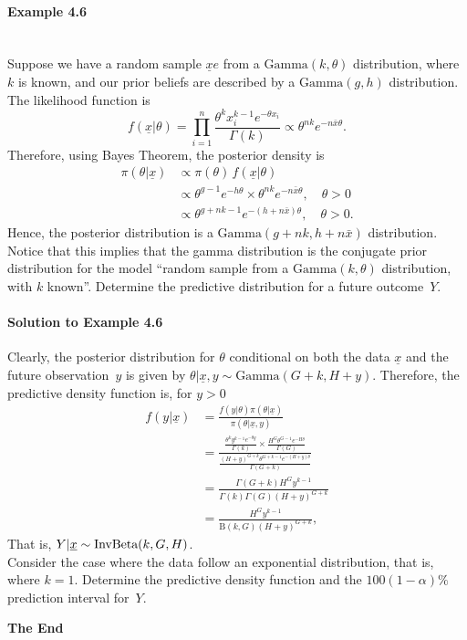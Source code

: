 \paragraph{Example 4.6}{~\\
  Suppose we have a random sample $\underline{x}e$ from a $\text{Gamma}(k,\theta)$
  distribution, where $k$ is known, and our prior beliefs are
  described by a $\text{Gamma}(g,h)$ distribution. The likelihood function is
$$ f(\underline{x}|\theta)=\prod_{i=1}^n \frac{\theta^k x_i^{k-1}e^{-\theta x_i}}{\Gamma(k)}\propto\theta^{nk}e^{-n\bar x\theta}.$$
 Therefore, using Bayes Theorem, the posterior density is
 \begin{align*}
  \pi(\theta|\underline{x}) &\propto\pi(\theta)\,f(\underline{x}|\theta) \\
  &\propto\theta^{g-1}e^{-h\theta}\times\theta^{nk}e^{-n\bar x\theta}, \quad\theta>0 \\
  &\propto\theta^{g+nk-1}e^{-(h+n\bar x)\theta},\quad\theta>0.
\end{align*}
Hence, the posterior distribution is a $\text{Gamma}(g+nk,h+n\bar x)$ distribution. Notice that this implies that the gamma distribution is the conjugate prior distribution for the model ``random sample from a $\text{Gamma}(k,\theta)$ distribution, with $k$ known''. Determine the predictive distribution for a future outcome~$Y$.

\paragraph{Solution to Example 4.6}{
    
    
    
}

\clearpage

{
    
    Clearly, the posterior distribution for $\theta$ conditional on both
    the data $\underline{x}$ and the future observation~$y$ is given by
    $\theta|\underline{x},y\sim \text{Gamma}(G+k,H+y)$. Therefore, the predictive density
    function is, for $y>0$
    \begin{align*}
    f(y|\underline{x})&=\frac{f(y|\theta)\pi(\theta|\underline{x})}{\pi(\theta|\underline{x},y)}\\
    {}
    &=\frac{\frac{\theta^k y^{k-1}e^{-\theta y}}{\Gamma(k)}
    \times \frac{H^G\theta^{G-1}e^{-H\theta}}{\Gamma(G)}}
    {\frac{(H+y)^{G+k}\theta^{G+k-1}e^{-(H+y)\theta}}{\Gamma(G+k)}}\\
    {}
    &=\frac{\Gamma(G+k)H^Gy^{k-1}}{\Gamma(k)\Gamma(G)(H+y)^{G+k}}\\ 
    {}
    &=\frac{H^Gy^{k-1}}{\mathrm{B}(k,G)(H+y)^{G+k}},
    \end{align*}
    That is, $Y|\underline{x}\sim \textnormal{\text{InvBeta}}(k,G,H)$. \\ 
    Consider the case where the data follow an exponential distribution, that is, where $k=1$. Determine the predictive density function and the $100(1-\alpha)\%$ prediction interval for~$Y$.
    
    
}}

\clearpage

\thispagestyle{empty}
\vspace*{0.25\textheight}

\bfseries\fontsize{60pt}{60pt}\selectfont The End
